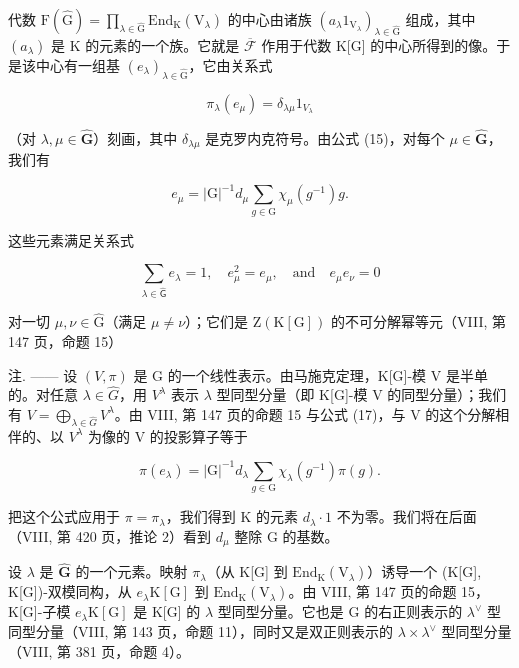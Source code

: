 代数 \(\mathrm{F}(\widehat{\mathrm{G}})=\prod_{\lambda\in\widehat{\mathrm{G}}} \mathrm{End}_{\mathrm{K}}(\mathrm{V}_{\lambda})\) 的中心由诸族 \((a_{\lambda}1_{\mathrm{V}_{\lambda}})_{\lambda\in\widehat{\mathrm{G}}}\) 组成，其中 \((a_{\lambda})\) 是 K 的元素的一个族。它就是 \(\overline{{\mathcal{F}}}\) 作用于代数 K{[}G{]} 的中心所得到的像。于是该中心有一组基 \((e_{\lambda})_{\lambda\in\widehat{\mathrm{G}}}\)，它由关系式

\[
\pi_ {\lambda} (e _ {\mu}) = \delta_ {\lambda \mu} 1 _ {V _ {\lambda}}\tag{16}
\]

（对 \(\lambda, \mu \in \widehat{\mathbf{G}}\)）刻画，其中 \(\delta_{\lambda \mu}\) 是克罗内克符号。由公式 (15)，对每个 \(\mu \in \widehat{\mathbf{G}}\)，我们有

\[
e _ {\mu} = | \mathrm{G} | ^ {- 1} d _ {\mu} \sum_ {g \in \mathrm{G}} \chi_ {\mu} (g ^ {- 1}) g.\tag{17}
\]

这些元素满足关系式

\[
\sum_ {\lambda \in \widehat {\mathsf {G}}} e _ {\lambda} = 1, \quad e _ {\mu} ^ {2} = e _ {\mu}, \quad \mathrm{and} \quad e _ {\mu} e _ {\nu} = 0\tag{18}
\]

对一切 \(\mu, \nu \in \widehat{\mathrm{G}}\)（满足 \(\mu \neq \nu\)）；它们是 \(\mathrm{Z}(\mathrm{K}[\mathrm{G}])\) 的不可分解幂等元（VIII, 第 147 页，命题 15）

注. —— 设 \((V, \pi)\) 是 G 的一个线性表示。由马施克定理，K{[}G{]}-模 V 是半单的。对任意 \(\lambda \in \widehat{G}\)，用 \(V^{\lambda}\) 表示 \(\lambda\) 型同型分量（即 K{[}G{]}-模 V 的同型分量）；我们有 \(V = \bigoplus_{\lambda \in \widehat{G}} V^{\lambda}\)。由 VIII, 第 147 页的命题 15 与公式 (17)，与 V 的这个分解相伴的、以 \(V^{\lambda}\) 为像的 V 的投影算子等于

\[
\pi (e _ {\lambda}) = | \mathrm{G} | ^ {- 1} d _ {\lambda} \sum_ {g \in \mathrm{G}} \chi_ {\lambda} (g ^ {- 1}) \pi (g).\tag{19}
\]

把这个公式应用于 \(\pi = \pi_{\lambda}\)，我们得到 K 的元素 \(d_{\lambda} \cdot 1\) 不为零。我们将在后面（VIII, 第 420 页，推论 2）看到 \(d_{\mu}\) 整除 G 的基数。

设 \(\lambda\) 是 \(\widehat{\mathbf{G}}\) 的一个元素。映射 \(\pi_{\lambda}\)（从 K{[}G{]} 到 \(\mathrm{End}_{\mathrm{K}}(\mathrm{V}_{\lambda})\)）诱导一个 (K{[}G{]}, K{[}G{]})-双模同构，从 \(e_{\lambda}\mathrm{K}[\mathrm{G}]\) 到 \(\mathrm{End}_{\mathrm{K}}(\mathrm{V}_{\lambda})\)。由 VIII, 第 147 页的命题 15，K{[}G{]}-子模 \(e_{\lambda}\mathrm{K}[\mathrm{G}]\) 是 K{[}G{]} 的 \(\lambda\) 型同型分量。它也是 G 的右正则表示的 \(\lambda^{\vee}\) 型同型分量（VIII, 第 143 页，命题 11），同时又是双正则表示的 \(\lambda \times \lambda^{\vee}\) 型同型分量（VIII, 第 381 页，命题 4）。

